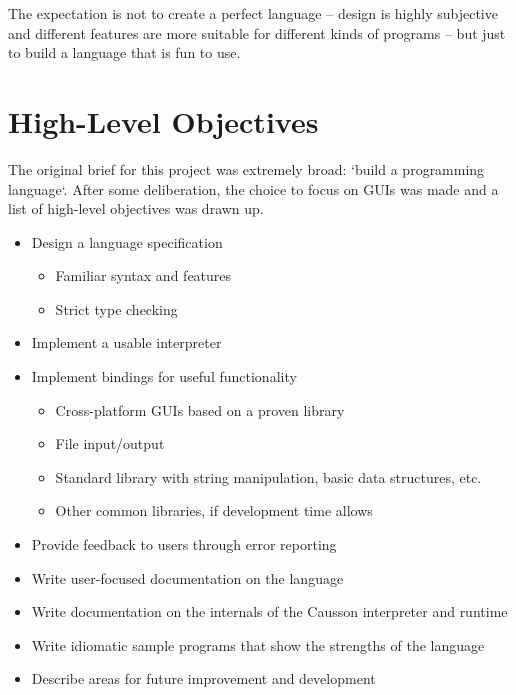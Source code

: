 \documentclass[11pt]{report}
\begin{document}
The expectation is not to create a perfect language – design is highly subjective and different features are more suitable for different kinds of programs – but just to build a language that is fun to use.

\section{High-Level Objectives} \label{secHLObjectives}

The original brief for this project was extremely broad: `build a programming language`. After some deliberation, the choice to focus on GUIs was made and a list of high-level objectives was drawn up.

\begin{itemize}
\item Design a language specification

\begin{itemize}
    \item Familiar syntax and features

    \item Strict type checking
\end{itemize}

\item Implement a usable interpreter

\item Implement bindings for useful functionality

\begin{itemize}
    \item Cross-platform GUIs based on a proven library

    \item File input/output

    \item Standard library with string manipulation, basic data structures, etc.

    \item Other common libraries, if development time allows
\end{itemize}

\item Provide feedback to users through error reporting

\item Write user-focused documentation on the language

\item Write documentation on the internals of the Causson interpreter and runtime

\item Write idiomatic sample programs that show the strengths of the language

\item Describe areas for future improvement and development
\end{itemize}
\end{document}
